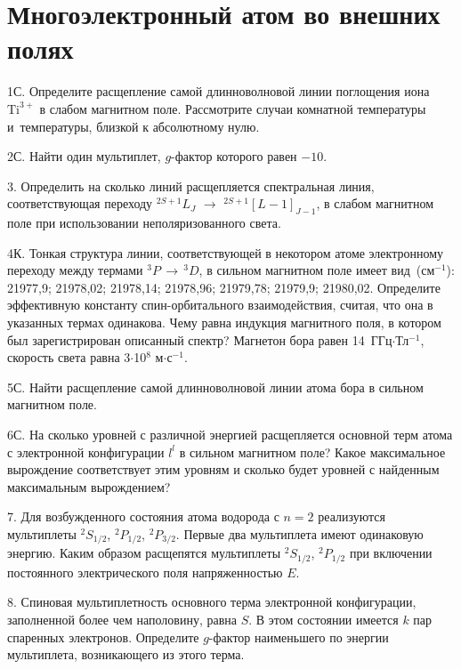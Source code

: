 \setmainfont{Noto Serif}
\setsansfont{Noto Sans}
\setmonofont{Noto Sans Mono}


\section{Многоэлектронный атом во внешних полях}

1С. Определите расщепление самой длинноволновой линии поглощения иона $\text{Ti}^{3+}$ в слабом магнитном поле. Рассмотрите случаи комнатной температуры и~температуры, близкой к абсолютному нулю.
\par
2С. Найти один мультиплет, $g$-фактор которого равен $-10$.
\par
3. Определить на сколько линий расщепляется спектральная линия, соответствующая переходу $^{2S+1}L_J$ $\rightarrow$ $^{2S+1}[L-1]_{J-1}$, в слабом магнитном поле при использовании неполяризованного света.
\par
4К. Тонкая структура линии, соответствующей в некотором атоме электронному переходу между термами $^3P \,\rightarrow\,^3D$, в сильном магнитном поле имеет вид~(см$^{-1}$): 21977,9; 21978,02; 21978,14; 21978,96; 21979,78; 21979,9; 21980,02. Определите эффективную константу спин-орбитального взаимодействия, считая, что она в указанных термах одинакова. Чему равна индукция магнитного поля, в котором был зарегистрирован описанный спектр? Магнетон бора равен 14~ГГц$\cdot$Тл$^{-1}$, скорость света равна 3$\cdot$10$^8$ м$\cdot$с$^{-1}$.
\par
5С. Найти расщепление самой длинноволновой линии атома бора в сильном магнитном поле.
\par
6С. На сколько уровней с различной энергией расщепляется основной терм атома с электронной конфигурации $l^l$ в сильном магнитном поле? Какое максимальное вырождение соответствует этим уровням и сколько будет уровней с найденным максимальным вырождением?
\par
7. Для возбужденного состояния атома водорода с $n = 2$ реализуются мультиплеты $^2S_{1/2}$, $^2P_{1/2}$, $^2P_{3/2}$. Первые два мультиплета имеют одинаковую энергию. Каким образом расщепятся мультиплеты $^2S_{1/2}$, $^2P_{1/2}$ при включении постоянного электрического поля напряженностью $E$.
\par
8. Спиновая мультиплетность основного терма электронной конфигурации, заполненной более чем наполовину, равна $S$. В этом состоянии имеется $k$ пар спаренных электронов. Определите $g$-фактор наименьшего по энергии мультиплета, возникающего из этого терма.
